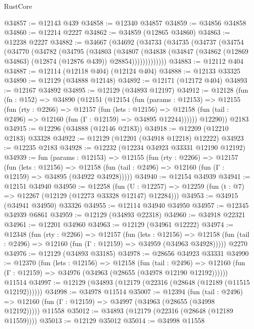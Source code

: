 \begin{lexlean}{RustCore}
\begin{coremodule}
@34857 := @12143 @439
@34858 := @12340 @34857
@34859 := @34856 @34858
@34860 := @12214 @2227
@34862 := @34859 (@12865 @34860)
@34863 := @12238 @2227
@34882 := @34667
    (@34692
      (@34733
        (@34735
          (@34737
            (@34754
              (@34770
                (@34782
                  (@34795
                    (@34803
                      (@34807
                        (@34838
                          (@34847 (@34862 (@12869 @34863) (@12874 (@12876 @439)) @28854)))))))))))))
@34883 := @12112 @404
@34887 := @12114 (@12118 @404) (@12124 @404)
@34888 := @12133 @33325
@34890 := @12129 (@34888 @12148)
@34892 := @12171 (@12172 @404)
@34893 := @12167 @34892
@34895 := @12129 (@34893 @12197)
@34912 := @12128
    (fun (fn : @152) =>
    @34890
      (@12151
        (@12154
          (fun (params : @12153) =>
          @12155
            (fun (rty : @2266) =>
            @12157
              (fun (lets : @12156) =>
              @12158 (fun (tail : @2496) => @12160 (fun (Γ : @12159) => @34895 @12244))))))
        @12290))
    @2183
@34915 := @12296 (@34888 (@12146 @2183))
@34918 := @12209 (@12210 @2183) @33328
@34922 := @12129 (@12201 (@34918 @12218) @12222)
@34923 := @12235 @2183
@34928 := @12232 (@12234 @34923 @33331 @12190 @12192)
@34939 := fun (params : @12153) =>
  @12155
    (fun (rty : @2266) =>
    @12157
      (fun (lets : @12156) =>
      @12158 (fun (tail : @2496) => @12160 (fun (Γ : @12159) => @34895 (@34922 @34928)))))
@34940 := @12154 @34939
@34941 := @12151 @34940
@34950 := @12258
    (fun (U : @12257) => @12259 (fun (t : @7) => @12267 (@12129 (@12273 @33328 @12147) @12284)))
@34953 := @34915 (@34941 @34950) @33326
@34955 := @12114 @34940 @34950
@34957 := @12345 @34939 @6861
@34959 := @12129 (@34893 @22318)
@34960 := @34918 @22321
@34961 := @12201 @34960
@34963 := @12129 (@34961 @12222)
@34974 := @12348
    (fun (rty : @2266) =>
    @12157
      (fun (lets : @12156) =>
      @12158 (fun (tail : @2496) => @12160 (fun (Γ : @12159) => @34959 (@34963 @34928)))))
    @2270
@34976 := @12129 (@34893 @33185)
@34978 := @28656 @34923 @33331
@34990 := @12370
    (fun (lets : @12156) =>
    @12158
      (fun (tail : @2496) =>
      @12160 (fun (Γ : @12159) => @34976 (@34963 (@28655 (@34978 @12190 @12192))))))
    @11514
@34997 := @12129 (@34893 (@12179 (@22316 (@28648 (@12189 (@11515 @12192))))))
@34998 := @34978 @11514
@35007 := @12394
    (fun (tail : @2496) => @12160 (fun (Γ : @12159) => @34997 (@34963 (@28655 (@34998 @12192)))))
    @11558
@35012 := @34893 (@12179 (@22316 (@28648 (@12189 @11559))))
@35013 := @12129 @35012
@35014 := @34998 @11558

\end{coremodule}
\end{lexlean}
